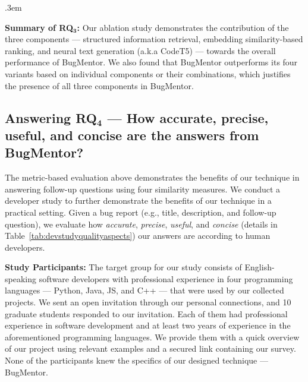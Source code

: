 \FrameSep.3em
\begin{frshaded}
	\noindent
	\textbf{Summary of RQ$\mathbf{_3}$:} Our ablation study demonstrates the contribution of the three components --- structured information retrieval, embedding similarity-based ranking, and neural text generation (a.k.a CodeT5) --- towards the overall performance of BugMentor. We also found that BugMentor outperforms its four variants based on individual components or their combinations, which justifies the presence of all three components in BugMentor.
\end{frshaded} 


\subsection{Answering RQ$\mathbf{_4}$ --- How accurate, precise, useful, and concise are the answers from BugMentor?}

The metric-based evaluation above demonstrates the benefits of our technique in answering follow-up questions using four similarity measures. We conduct a developer study to further demonstrate the benefits of our technique in a practical setting. Given a bug report (e.g., title, description, and follow-up question), we evaluate how \emph{accurate}, \emph{precise}, \emph{useful}, and \emph{concise} (details in Table~\ref{tab:devstudyqualityaspects}) our answers are according to human developers.\par

\begin{table}[ht]
\centering
\caption{Quality Aspects of the Generated Answers}
\label{tab:devstudyqualityaspects}
\renewcommand{\arraystretch}{1.5}
\end{table}

\textbf{Study Participants:} 
The target group for our study consists of English-speaking software developers with professional experience in four programming languages --- Python, Java, JS, and C++ --- that were used by our collected projects. We sent an open invitation through our personal connections, and 10 graduate students responded to our invitation. Each of them had professional experience in software development and at least two years of experience in the aforementioned programming languages. We provide them with a quick overview of our project using relevant examples and a secured link containing our survey. None of the participants knew the specifics of our designed technique --- BugMentor. \par

